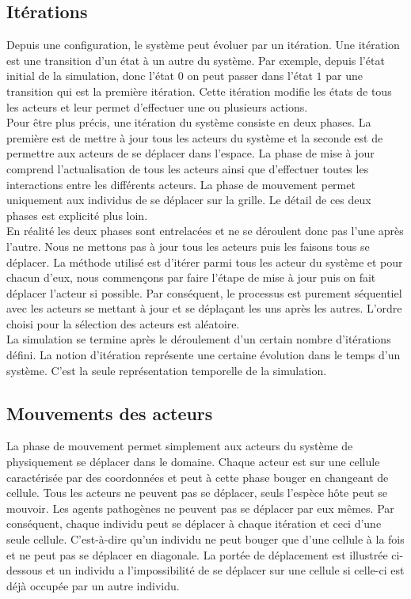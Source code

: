 \subsection{Itérations}

Depuis une configuration, le système peut évoluer par un itération. Une itération est une transition d'un état à un autre du système. Par exemple, depuis l'état initial de la simulation, donc l'état $0$ on peut passer dans l'état $1$ par une transition qui est la première itération. Cette itération modifie les états de tous les acteurs et leur permet d'effectuer une ou plusieurs actions.\\

Pour être plus précis, une itération du système consiste en deux phases. La première est de mettre à jour tous les acteurs du système et la seconde est de permettre aux acteurs de se déplacer dans l'espace. La phase de mise à jour comprend l'actualisation de tous les acteurs ainsi que d'effectuer toutes les interactions entre les différents acteurs. La phase de mouvement permet uniquement aux individus de se déplacer sur la grille. Le détail de ces deux phases est explicité plus loin.\\

En réalité les deux phases sont entrelacées et ne se déroulent donc pas l'une après l'autre. Nous ne mettons pas à jour tous les acteurs puis les faisons tous se déplacer. La méthode utilisé est d'itérer parmi tous les acteur du système et pour chacun d'eux, nous commençons par faire l'étape de mise à jour puis on fait déplacer l'acteur si possible. Par conséquent, le processus est purement séquentiel avec les acteurs se mettant à jour et se déplaçant les uns après les autres. L'ordre choisi pour la sélection des acteurs est aléatoire.\\

La simulation se termine après le déroulement d'un certain nombre d'itérations défini. La notion d'itération représente une certaine évolution dans le temps d'un système. C'est la seule représentation temporelle de la simulation.

\subsection{Mouvements des acteurs}

La phase de mouvement permet simplement aux acteurs du système de physiquement se déplacer dans le domaine. Chaque acteur est sur une cellule caractérisée par des coordonnées et peut à cette phase bouger en changeant de cellule. Tous les acteurs ne peuvent pas se déplacer, seuls l'espèce hôte peut se mouvoir. Les agents pathogènes ne peuvent pas se déplacer par eux mêmes. Par conséquent, chaque individu peut se déplacer à chaque itération et ceci d'une seule cellule. C'est-à-dire qu'un individu ne peut bouger que d'une cellule à la fois et ne peut pas se déplacer en diagonale. La portée de déplacement est illustrée ci-dessous et un individu a l'impossibilité de se déplacer sur une cellule si celle-ci est déjà occupée par un autre individu.\\

